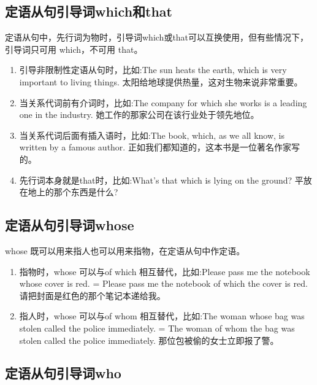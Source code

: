\subsection{定语从句引导词which和that}

定语从句中，先行词为物时，引导词which或that可以互换使用，但有些情况下，引导词只可用 which，不可用 that。
\begin{enumerate}
  \item 引导非限制性定语从句时，比如:The sun heats the earth, which is very important to living things. 太阳给地球提供热量，这对生物来说非常重要。
  \item 当关系代词前有介词时，比如:The company for which she works is a leading one in the industry. 她工作的那家公司在该行业处于领先地位。
  \item 当关系代词后面有插入语时，比如:The book, which, as we all know, is written by a famous author. 正如我们都知道的，这本书是一位著名作家写的。
  \item 先行词本身就是that时，比如:What's that which is lying on the ground? 平放在地上的那个东西是什么?
\end{enumerate}

\subsection{定语从句引导词whose}

whose 既可以用来指人也可以用来指物，在定语从句中作定语。
\begin{enumerate}
  \item 指物时，whose 可以与of which 相互替代，比如:Please pass me the notebook whose cover is red. = Please pass me the notebook of which the cover is red. 请把封面是红色的那个笔记本递给我。
  \item 指人时，whose 可以与of whom 相互替代，比如:The woman whose bag was stolen called the police immediately. = The woman of whom the bag was stolen called the police immediately. 那位包被偷的女士立即报了警。
\end{enumerate}

\subsection{定语从句引导词who}


